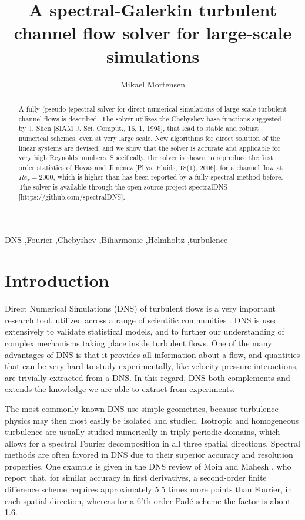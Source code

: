 \documentclass[preprint]{elsarticle}
\begin{document}
\begin{frontmatter}

\title{A spectral-Galerkin turbulent channel flow solver for large-scale simulations}
\author[mmo]{Mikael Mortensen}
\address[mmo]{Department of Mathematics, Division of Mechanics, University of Oslo}

\begin{abstract}
A fully (pseudo-)spectral solver for direct numerical simulations of large-scale turbulent channel flows is described. The solver utilizes the Chebyshev base functions suggested by J. Shen [SIAM J. Sci. Comput., 16, 1, 1995], that lead to stable and robust numerical schemes, even at very large scale. New algorithms for direct solution of the linear systems are devised, and we show that the solver is accurate and applicable for very high Reynolds numbers. Specifically, the solver is shown to reproduce the first order statistics of Hoyas and Jim\'{e}nez [Phys. Fluids, 18(1), 2006], for a channel flow at $Re_{\tau}=2000$, which is higher than has been reported by a fully spectral method before. The solver is available through the open source project spectralDNS [https://github.com/spectralDNS].
\end{abstract}
\begin{keyword}
DNS \sep Fourier \sep Chebyshev \sep Biharmonic \sep Helmholtz \sep turbulence
\end{keyword}

\end{frontmatter}
\section{Introduction}
Direct Numerical Simulations (DNS) of turbulent flows is a very important research tool, utilized across a range of scientific communities \cite{Moin98}. DNS is used extensively to validate statistical models, and to further our understanding of complex mechanisms taking place inside turbulent flows. One of the many advantages of DNS is that it provides all information about a flow, and quantities that can be very hard to study experimentally, like velocity-pressure interactions, are trivially extracted from a DNS. In this regard, DNS both complements and extends the knowledge we are able to extract from experiments.

The most commonly known DNS use simple geometries, because turbulence physics may then most easily be isolated and studied. Isotropic and homogeneous turbulence are usually studied numerically in triply periodic domains, which allows for a spectral Fourier decomposition in all three spatial directions. Spectral methods are often favored in DNS due to their superior accuracy and resolution properties. One example is given in the DNS review of Moin and Mahesh \cite{Moin98}, who report that, for similar accuracy in first derivatives, a second-order finite difference scheme requires approximately 5.5 times more points than Fourier, in each spatial direction, whereas for a 6'th order Pad\'{e} scheme the factor is about 1.6.
\end{document}
